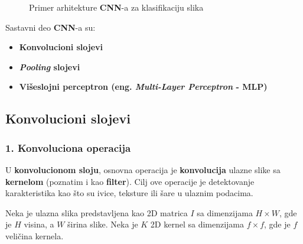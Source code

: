 \documentclass[12pt]{article}
\begin{document}
     \begin{figure}[h!]
      \centering
      \caption{Primer arhitekture \textbf{CNN}-a za klasifikaciju slika}
      \label{fig:cnn_architecture}
    \end{figure}
    
    \vspace{0.7cm}
   
    Sastavni deo \textbf{CNN}-a su:
    \begin{itemize}
      \vspace{-0.5cm}
      \setlength\itemsep{0em}
      \item \textbf{Konvolucioni slojevi}
      \item \textbf{\textit{Pooling} slojevi}
      \item \textbf{Višeslojni perceptron (eng. \textbf{\textit{Multi-Layer Perceptron}} - \textbf{MLP})}
   \end{itemize}

   \newpage

   \subsection*{Konvolucioni slojevi}
   \subsubsection*{1. Konvoluciona operacija}
   U \textbf{konvolucionom sloju}, osnovna operacija je \textbf{konvolucija} ulazne slike sa \textbf{kernelom} (poznatim i kao \textbf{filter}).
   Cilj ove operacije je detektovanje karakteristika kao što su ivice, teksture 
   ili šare u ulaznim podacima.

   Neka je ulazna slika predstavljena kao 2D matrica \( I \) 
   sa dimenzijama \( H \times W \), gde je \( H \) visina, 
   a \( W \) širina slike. Neka je \( K \) 2D kernel sa 
   dimenzijama \( f \times f \), gde je \( f \) veličina kernela.
   
\end{document}
